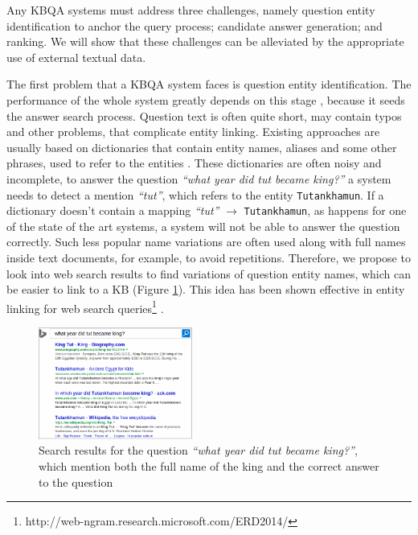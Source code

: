 Any KBQA systems must address three challenges, namely question entity identification to anchor the query process; candidate answer generation; and ranking.
We will show that these challenges can be alleviated by the appropriate use of external textual data.

The first problem that a KBQA system faces is question entity identification.
The performance of the whole system greatly depends on this stage \cite{yao-scratch-qa-naacl2015}, because it seeds the answer search process.
Question text is often quite short, may contain typos and other problems, that complicate entity linking.
Existing approaches are usually based on dictionaries that contain entity names, aliases and some other phrases, used to refer to the entities \cite{SPITKOVSKY12.266}.
These dictionaries are often noisy and incomplete, \eg to answer the question \textit{``what year did tut became king?''} a system needs to detect a mention \textit{``tut''}, which refers to the entity \texttt{Tutankhamun}.
If a dictionary doesn't contain a mapping \textit{``tut''} $\rightarrow$ \texttt{Tutankhamun}, as happens for one of the state of the art systems, a system will not be able to answer the question correctly.
Such less popular name variations are often used along with full names inside text documents, for example, to avoid repetitions.
Therefore, we propose to look into web search results to find variations of question entity names, which can be easier to link to a KB (Figure \ref{fig:web_search_entitylink}).
This idea has been shown effective in entity linking for web search queries\footnote{http://web-ngram.research.microsoft.com/ERD2014/} \cite{SMAPH_ERD:2014}.

\begin{figure}[!h]
\centering
\includegraphics[width=0.45\textwidth]{img/web_search_entitylink}
\caption{Search results for the question \textit{``what year did tut became king?''}, which mention both the full name of the king and the correct answer to the question}
\label{fig:web_search_entitylink}
\end{figure}

